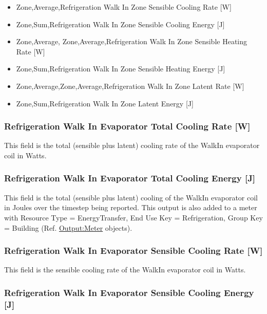 \begin{itemize}
\item
  Zone,Average,Refrigeration Walk In Zone Sensible Cooling Rate {[}W{]}
\item
  Zone,Sum,Refrigeration Walk In Zone Sensible Cooling Energy {[}J{]}
\item
  Zone,Average, Zone,Average,Refrigeration Walk In Zone Sensible Heating Rate {[}W{]}
\item
  Zone,Sum,Refrigeration Walk In Zone Sensible Heating Energy {[}J{]}
\item
  Zone,Average,Zone,Average,Refrigeration Walk In Zone Latent Rate {[}W{]}
\item
  Zone,Sum,Refrigeration Walk In Zone Latent Energy {[}J{]}
\end{itemize}

\subsubsection{Refrigeration Walk In Evaporator Total Cooling Rate {[}W{]}}\label{refrigeration-walk-in-evaporator-total-cooling-rate-w}

This field is the total (sensible plus latent) cooling rate of the WalkIn evaporator coil in Watts.

\subsubsection{Refrigeration Walk In Evaporator Total Cooling Energy {[}J{]}}\label{refrigeration-walk-in-evaporator-total-cooling-energy-j}

This field is the total (sensible plus latent) cooling of the WalkIn evaporator coil in Joules over the timestep being reported. This output is also added to a meter with Resource Type = EnergyTransfer, End Use Key = Refrigeration, Group Key = Building (Ref. \hyperref[outputmeter-and-outputmetermeterfileonly]{Output:Meter} objects).

\subsubsection{Refrigeration Walk In Evaporator Sensible Cooling Rate {[}W{]}}\label{refrigeration-walk-in-evaporator-sensible-cooling-rate-w}

This field is the sensible cooling rate of the WalkIn evaporator coil in Watts.

\subsubsection{Refrigeration Walk In Evaporator Sensible Cooling Energy {[}J{]}}\label{refrigeration-walk-in-evaporator-sensible-cooling-energy-j}

